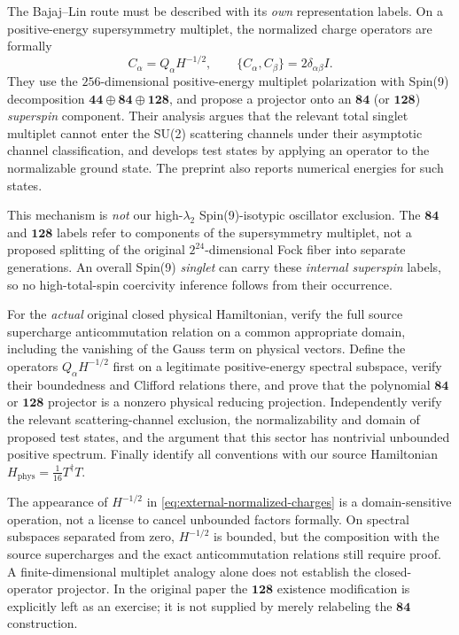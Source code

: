 The Bajaj--Lin route must be described with its \emph{own}
representation labels. On a positive-energy supersymmetry
multiplet, the normalized charge operators are formally
\begin{equation}\label{eq:external-normalized-charges}
 C_\alpha=Q_\alpha H^{-1/2},\qquad
 \{C_\alpha,C_\beta\}=2\delta_{\alpha\beta}I.
\end{equation}
They use the $256$-dimensional positive-energy
multiplet polarization with Spin(9) decomposition
$\mathbf{44}\oplus\mathbf{84}\oplus\mathbf{128}$,
and propose a projector onto an $\mathbf{84}$ (or
$\mathbf{128}$) \emph{superspin} component. Their
analysis argues that the relevant total singlet
multiplet cannot enter the SU(2) scattering
channels under their asymptotic channel classification,
and develops test states by applying an operator to
the normalizable ground state. The preprint also
reports numerical energies for such states.

This mechanism is \emph{not} our high-$\lambda_2$
Spin(9)-isotypic oscillator exclusion.
The $\mathbf{84}$ and $\mathbf{128}$ labels refer to
components of the supersymmetry multiplet, not
a proposed splitting of the original $2^{24}$-dimensional
Fock fiber into separate generations. An overall
Spin(9) \emph{singlet} can carry these
\emph{internal superspin} labels, so no high-total-spin
coercivity inference follows from their occurrence.

\begin{openproblem}\label{op:external-susy-projector}
For the \emph{actual} original closed physical Hamiltonian,
verify the full source supercharge anticommutation relation
on a common appropriate domain, including the vanishing of
the Gauss term on physical vectors. Define the operators
$Q_\alpha H^{-1/2}$ first on a legitimate positive-energy
spectral subspace, verify their boundedness and Clifford
relations there, and prove that the polynomial
$\mathbf{84}$ or $\mathbf{128}$ projector is a
nonzero physical reducing projection. Independently
verify the relevant scattering-channel exclusion,
the normalizability and domain of proposed test states,
and the argument that this sector has nontrivial
unbounded positive spectrum. Finally identify all
conventions with our source Hamiltonian
$H_{\mathrm{phys}}=\tfrac1{16}T^\dagger T$.
\end{openproblem}

The appearance of $H^{-1/2}$ in
\eqref{eq:external-normalized-charges} is a domain-sensitive
operation, not a license to cancel unbounded factors
formally. On spectral subspaces separated from zero,
$H^{-1/2}$ is bounded, but the composition with the
source supercharges and the exact anticommutation
relations still require proof. A finite-dimensional
multiplet analogy alone does not establish the
closed-operator projector. In the original paper the
$\mathbf{128}$ existence modification is explicitly
left as an exercise; it is not supplied by merely
relabeling the $\mathbf{84}$ construction.

